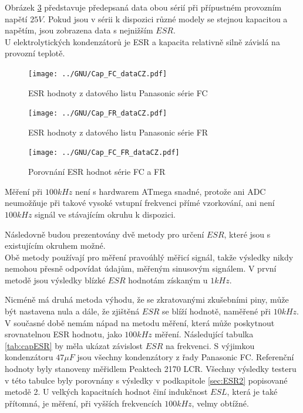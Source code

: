 Obrázek \ref{fig:Cap_FC_FR_data} představuje předepsaná data obou sérií při přípustném provozním napětí \(25V\). Pokud jsou v sérii k dispozici různé modely se stejnou kapacitou a napětím,
jsou zobrazena data s nejnižším \(ESR\).\\
U elektrolytických kondenzátorů je ESR a kapacita relativně silně závislá na provozní teplotě.

\begin{figure}[H]
  \centering
  \texttt{[image: ../GNU/Cap\_FC\_dataCZ.pdf]}
  \caption{ESR hodnoty z datového listu Panasonic série FC}
  \label{fig:Cap_FC_data}
\end{figure}

\begin{figure}[H]
  \centering
  \texttt{[image: ../GNU/Cap\_FR\_dataCZ.pdf]}
  \caption{ESR hodnoty z datového listu Panasonic série FR}
  \label{fig:Cap_FR_data}
\end{figure}

\begin{figure}[H]
  \centering
  \texttt{[image: ../GNU/Cap\_FC\_FR\_dataCZ.pdf]}
  \caption{Porovnání ESR hodnot série FC a FR}
  \label{fig:Cap_FC_FR_data}
\end{figure}

Měření při \(100kHz\) není s hardwarem ATmega snadné, protože ani ADC neumožňuje při takové vysoké vstupní frekvenci přímé vzorkování, ani není \(100kHz\) signál ve stávajícím okruhu k dispozici.

Následovně budou prezentovány dvě metody pro určení  \(ESR\), které jsou s existujícím okruhem možné.\\
Obě metody používají  pro měření pravoúhlý měřicí signál, takže výsledky nikdy nemohou přesně odpovídat údajům, měřeným sinusovým signálem.
V první metodě jsou výsledky blízké   \(ESR\) hodnotám získaným u \(1kHz\).

Nicméně má druhá metoda výhodu, že se zkratovanými zkušebními piny, může být nastavena nula a dále, že zjištěná  \(ESR\) se blíží hodnotě, naměřené při \(10kHz\).
V současné době nemám nápad na metodu měření, která může poskytnout srovnatelnou ESR hodnotu, jako \(100kHz\)  měření.
Následující tabulka \ref{tab:capESR} by měla ukázat závislost \(ESR\) na frekvenci.
S výjimkou kondenzátoru \(47\mu F\) jsou všechny kondenzátory z řady Panasonic FC.
Referenční hodnoty byly stanoveny měřidlem Peaktech 2170 LCR.
Všechny výsledky testeru v této tabulce byly porovnány s výsledky v podkapitole \ref{sec:ESR2} popisované metodě 2.
U velkých kapacitních hodnot činí indukčnost \(ESL\), která je také přítomná, je měření,
při vyšších frekvencích \(100kHz\), velmy obtížné.


